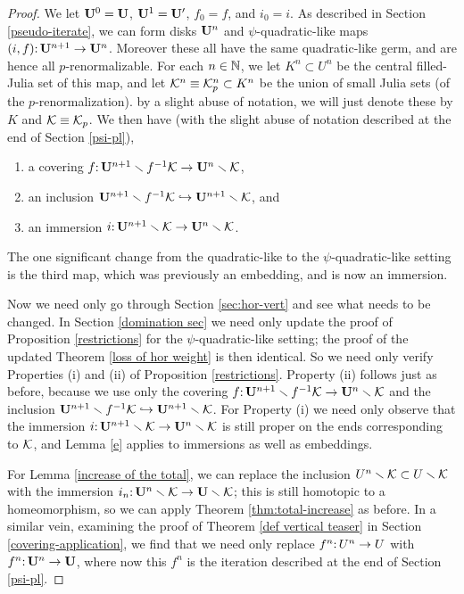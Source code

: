 \begin{proof}
We let $\mathbf U^0 = \mathbf U$, $\mathbf U^1 = \mathbf U'$, $f_0 = f$, and $i_0 = i$. 
As described in Section \ref{pseudo-iterate},
we can form disks $\mathbf U^n$ and $\psi$-quadratic-like maps $(i, f)\mathpunct: \mathbf U^{n+1} \to \mathbf U^n$.
Moreover these all have the same quadratic-like germ,
and are hence all $p$-renormalizable.
For each $n \in {\Bbb N}$,
we let $K^n \subset U^n$ be the central filled-Julia set of this map,
and let ${\mathcal K}^n \equiv {\mathcal K}_p^n \subset K^n$ be the union of small Julia sets (of the $p$-renormalization).
by a slight abuse of notation, 
we will just denote these by $K$ and ${\mathcal K} \equiv {\mathcal K}_p$.
We then have 
(with the slight abuse of notation described at the end of Section \ref{psi-pl}),
\begin{enumerate}
\item
a covering $f\mathpunct: \mathbf U^{n+1} \smallsetminus f^{-1} {\mathcal K} \to \mathbf U^n \smallsetminus {\mathcal K}$,
\item
an inclusion $\mathbf U^{n+1} \smallsetminus f^{-1} {\mathcal K} \hookrightarrow \mathbf U^{n+1} \smallsetminus {\mathcal K}$, and
\item
an immersion $i\mathpunct:\mathbf U^{n+1} \smallsetminus {\mathcal K} \to \mathbf U^n \smallsetminus {\mathcal K}$.
\end{enumerate}
The one significant change from the quadratic-like to the $\psi$-quadratic-like setting is the third map, 
which was previously an embedding, and is now an immersion. 

Now we need only go through Section \ref{sec:hor-vert} and see what needs to be changed.
In Section \ref{domination sec} we need only update the proof of Proposition \ref{restrictions} for the $\psi$-quadratic-like setting;
the proof of the updated Theorem \ref{loss of hor weight} is then identical. 
So we need only verify Properties (i) and (ii) of Proposition \ref{restrictions}.
Property (ii) follows just as before, 
because we use only the covering $f\mathpunct: \mathbf U^{n+1} \smallsetminus f^{-1} {\mathcal K} \to \mathbf U^n \smallsetminus {\mathcal K}$ and the inclusion $\mathbf U^{n+1} \smallsetminus f^{-1} {\mathcal K} \hookrightarrow \mathbf U^{n+1} \smallsetminus {\mathcal K}$.
For Property (i) we need only observe that the immersion $i\mathpunct:\mathbf U^{n+1} \smallsetminus {\mathcal K} \to \mathbf U^n \smallsetminus {\mathcal K}$ is still proper on the ends corresponding to ${\mathcal K}$,
and Lemma \ref{e} applies to immersions as well as embeddings.

For Lemma \ref{increase of the total},
we can replace the inclusion $U^n \smallsetminus {\mathcal K} \subset U \smallsetminus {\mathcal K}$ 
with the immersion $i_n\mathpunct: \mathbf U^n \smallsetminus {\mathcal K} \to \mathbf U \smallsetminus {\mathcal K}$;
this is still homotopic to a homeomorphism, 
so we can apply Theorem \ref{thm:total-increase} as before.
In a similar vein,
examining the proof of Theorem \ref{def vertical teaser} in Section \ref{covering-application},
we find that we need only replace $f^n\mathpunct: U^n\to U$ with $f^n\mathpunct: \mathbf U^n \to \mathbf U$,
where now this $f^n$ is the iteration described at the end of Section \ref{psi-pl}.
\end{proof}
